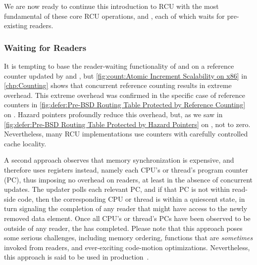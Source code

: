 We are now ready to continue this introduction to RCU with the most
fundamental of these core RCU operations,  and
, each of which waits for pre-existing readers.

\subsubsection{Waiting for Readers}
\label{sec:defer:Waiting for Readers}

It is tempting to base the reader-waiting functionality of
 and  on a reference counter
updated by  and , but
\cref{fig:count:Atomic Increment Scalability on x86}
in
\cref{chp:Counting}
shows that concurrent reference counting results in extreme overhead.
This extreme overhead was confirmed in the specific case of
reference counters in
\cref{fig:defer:Pre-BSD Routing Table Protected by Reference Counting}
on
.
Hazard pointers profoundly reduce this overhead, but, as we saw in
\cref{fig:defer:Pre-BSD Routing Table Protected by Hazard Pointers}
on
,
not to zero.
Nevertheless, many RCU implementations use counters with carefully
controlled cache locality.

A second approach observes that memory synchronization is expensive,
and therefore uses registers instead, namely each CPU's or thread's
program counter (PC), thus imposing no overhead on readers, at least
in the absence of concurrent updates.
The updater polls each relevant PC, and if that PC is not within read-side
code, then the corresponding CPU or thread is within a quiescent state,
in turn signaling the completion of any reader that might have access
to the newly removed data element.
Once all CPU's or thread's PCs have been observed to be outside of any
reader, the  has completed.
Please note that this approach poses some serious challenges, including
memory ordering, functions that are \emph{sometimes} invoked from readers,
and ever-exciting code-motion optimizations.
Nevertheless, this approach is said to be used in
production~\cite{MikeAsh2015Apple}.

